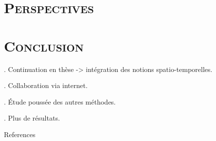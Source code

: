 \section{\scshape Perspectives}
\begin{frame}

\end{frame}

\section{\scshape Conclusion}
\begin{frame}
	. Continuation en thèse -> intégration des notions spatio-temporelles.
	
	. Collaboration via internet.
	
	. Étude poussée des autres méthodes.
	
	. Plus de résultats.
	
	
\end{frame}

{\small
\begin{frame}[allowframebreaks]{References}
	
	
	
	
\end{frame}
}